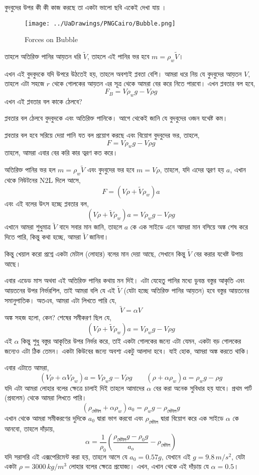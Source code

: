 \documentclass[11pt,a4paper]{article}
\begin{document}
বুদবুদের উপর কী কী কাজ করছে তা একটা ভালো ছবি একেই দেখা যায় । 
\begin{figure}[hbtp]
\centering
\texttt{[image: ../UaDrawings/PNGCairo/Bubble.png]}
\caption{Forces on Bubble}
\end{figure}
তাহলে অতিরিক্ত পানির আয়তন ধরি $\tilde{V}$, তাহলে এই পানির ভর হবে $m = \rho _w \tilde{V}$। 

এখন এই বুদবুদকে যদি উপরে উঠতেই হয়, তাহলে অবশ্যই প্লবতা বেশি। আমরা ধরে নিয় যে বুদবুদের আয়তন $V$, তাহলে এটা সহজে $r$ থেকে গোলকের আয়তন এর সূত্র থেকে আমরা বের করে নিতে পারবো। এখন প্লবতার বল হবে, 
\[ F_B = V  \rho_w  g - V \rho g  \] 
এখন এই প্লবতার বল কাকে ঠেলবে?

প্লবতার বল ঠেলবে বুদবুদকে এবং অতিরিক্ত পানিকে। আগে থেকেই জানি যে বুদবুদের ওজন যথেষ্ট কম। 

প্লবতার বল হবে সরিয়ে দেয়া পানি যত বল প্রয়োগ করছে এবং বিয়োগ বুদবুদের ভর, তাহলে,  
\[ F = V\rho_w g - V \rho g \]
তাহলে, আমরা এবার বের করি কার ত্বরণ কত করে। 

অতিরিক্ত পানির ভর হল $m = \rho _w \tilde{V}$ এবং বুদবুদের  ভর হবে $m = V \rho$, তাহলে, যদি এদের ত্বরণ হয় $a$, এখান থেকে নিউটনের N2L দিলে আসে, 
\[  F=  (V \rho + \tilde{V}\rho_w) a \] 
এবং এই বলের উৎস হচ্ছে প্লবতার বল, 
\[(V \rho + \tilde{V}\rho_w) a =  V\rho_w g - V \rho g \]
এখানে আমরা শুধুমাত্র $\tilde{V}$ বাদে সবার মান জানি, তাহলে $a$ কে এক সাইডে এনে আমরা মান বসিয়ে অঙ্ক শেষ করে দিতে পারি, কিন্তু কথা হচ্ছে, আমরা $\tilde{V}$ জানিনা। 

কিন্তু খেয়াল করো প্রশ্নে একটা মেটাল (লোহার) বলের মান দেয়া আছে, সেখানে কিন্তু $\tilde{V}$ বের করার যথেষ্ট উপায় আছে। 

এবার এডেড মাস অথবা এই অতিরিক্ত পানির কথায় মন দিই। এটা যেহেতু পানির মধ্যে ডুবন্ত বস্তুর আকৃতি এবং আয়তনের উপর নির্ভরশিল, তাই আমরা বলি যে এই $\tilde{V}$ (যেটা হচ্ছে অতিরিক্ত পানির আয়তন) হবে বস্তুর আয়তনের সমানুপাতিক। অতএব, আমরা এটা লিখতে পারি যে, 
\[\tilde{V} = \alpha V \] 
অঙ্ক সহজ হলো, কেন? শেষের সমীকরণ ছিল যে, 
\[(V \rho + \tilde{V}\rho_w) a =  V\rho_w g - V \rho g \]
এই $\alpha$ কিন্তু শুধু বস্তুর আকৃতির উপর নির্ভর করে, তাই একটা গোলকের জন্যে এটা যেমন, একটা বড় গোলকের জন্যেও এটা ঠিক তেমন। একটা কিউবের জন্যে অবশ্য একটু আলাদা হবে।  যাই হোক, আমরা অঙ্ক করতে থাকি। 


এবার এটাতে আমরা, 
\[(V \rho + \alpha V \rho_w) a =  V\rho_w g - V \rho g \quad \quad 
( \rho + \alpha \rho_w) a =  \rho_w g -  \rho g \] 
যদি এটা আমরা লোহার বলের ক্ষেত্রে চালাই দিই তাহলে আমাদের $\alpha$ বের করা অনেক সুবিধার হয় যাবে। প্রথম পার্ট (প্রবলেম) থেকে আমরা লিখতে পারি। 
\[( \rho_{\text{মেটাল}} + \alpha \rho_w) a_0 =  \rho_w g -  \rho_{\text{মেটাল}}  g \] 
এখান থেকে আমরা সমীকরণের দুদিকে $a_0$ দ্বারা ভাগ করবো এবং $\rho_{\text{মেটাল}}$ দ্বারা বিয়োগ করে এক সাইডে $\alpha$ কে আনবো, তাহলে দাঁড়ায়,
\[\alpha = \frac{1}{\rho_0} \left( \frac{\rho_{\text{মেটাল}} g - \rho _0 g}{a_o} - \rho_{\text{মেটাল}} \right) 
\]
যদি সরাসরি এই এক্সপেরিমেন্ট করা হয়, তাহলে আসে যে $a_0 = 0.57 g$, যেখানে এই $g = 9.8 \, m/s^2$, যেটা একটা $\rho = 3000 \, kg/m^3$ লোহার বলের ক্ষেত্রে প্রযোজ্য। এখন, এখান থেকে এই দাঁড়ায় যে $\alpha = 0.5 $। 
\end{document}
